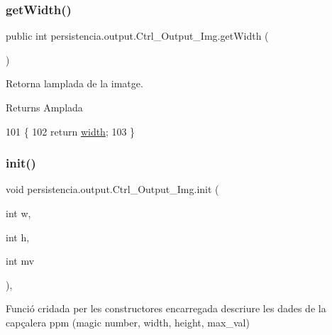 \subsubsection{\texorpdfstring{get\+Width()}{getWidth()}}
{\footnotesize\ttfamily public int persistencia.\+output.\+Ctrl\+\_\+\+Output\+\_\+\+Img.\+get\+Width (\begin{DoxyParamCaption}{ }\end{DoxyParamCaption})\hspace{0.3cm}{\ttfamily [inline]}}



Retorna l\textquotesingle{}amplada de la imatge. 

\begin{DoxyReturn}{Returns}
Amplada 
\end{DoxyReturn}

\begin{DoxyCode}
101                           \{
102         \textcolor{keywordflow}{return} \hyperlink{classpersistencia_1_1output_1_1Ctrl__Output__Img_ae4a01ec459078cece4815d2fe7db8a64}{width};
103     \}
\end{DoxyCode}
\mbox{\label{classpersistencia_1_1output_1_1Ctrl__Output__Img_aab3258280bd6abb81d580c93eb68fb28}} 
\subsubsection{\texorpdfstring{init()}{init()}}
{\footnotesize\ttfamily void persistencia.\+output.\+Ctrl\+\_\+\+Output\+\_\+\+Img.\+init (\begin{DoxyParamCaption}\item[{int}]{w,  }\item[{int}]{h,  }\item[{int}]{mv }\end{DoxyParamCaption})\hspace{0.3cm}{\ttfamily [inline]}, {\ttfamily [private]}}



Funció cridada per les constructores encarregada d\textquotesingle{}escriure les dades de la capçalera ppm (magic number, width, height, max\+\_\+val) 


